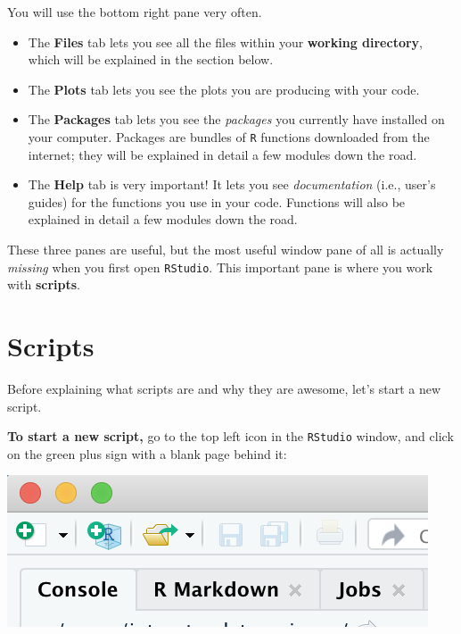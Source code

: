 \documentclass[
]{book}
\providecommand{\tightlist}{%
  \setlength{\itemsep}{0pt}\setlength{\parskip}{0pt}}
\begin{document}
You will use the bottom right pane very often.

\begin{itemize}
\tightlist
\item
  The \textbf{Files} tab lets you see all the files within your \textbf{working directory}, which will be explained in the section below.\\
\item
  The \textbf{Plots} tab lets you see the plots you are producing with your code.\\
\item
  The \textbf{Packages} tab lets you see the \emph{packages} you currently have installed on your computer. Packages are bundles of \texttt{R} functions downloaded from the internet; they will be explained in detail a few modules down the road.\\
\item
  The \textbf{Help} tab is very important! It lets you see \emph{documentation} (i.e., user's guides) for the functions you use in your code. Functions will also be explained in detail a few modules down the road.
\end{itemize}

These three panes are useful, but the most useful window pane of all is actually \emph{missing} when you first open \texttt{RStudio}. This important pane is where you work with \textbf{scripts}.

\hypertarget{scripts}{%
\section*{Scripts}\label{scripts}}

Before explaining what scripts are and why they are awesome, let's start a new script.

\textbf{To start a new script,} go to the top left icon in the \texttt{RStudio} window, and click on the green plus sign with a blank page behind it:

\includegraphics{img/rstudio_newscript.png}
\end{document}
